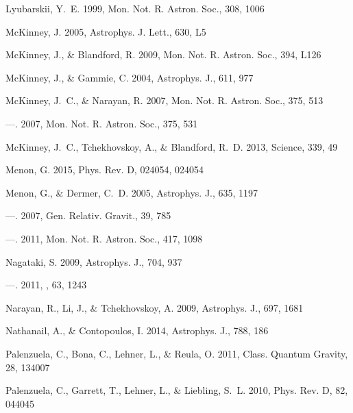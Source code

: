 \documentclass[iop,apj]{emulateapj}
\begin{document}
\begin{thebibliography}{}
Lyubarskii, Y.~E. 1999, Mon. Not. R. Astron. Soc., 308, 1006

McKinney, J. 2005, Astrophys. J. Lett., 630, L5

McKinney, J., \& Blandford, R. 2009, Mon. Not. R. Astron. Soc., 394, L126

McKinney, J., \& Gammie, C. 2004, Astrophys. J., 611, 977

McKinney, J.~C., \& Narayan, R. 2007{}, Mon. Not. R. Astron. Soc.,
  375, 513

---. 2007{}, Mon. Not. R. Astron. Soc., 375, 531

McKinney, J.~C., Tchekhovskoy, A., \& Blandford, R.~D. 2013, Science, 339, 49

Menon, G. 2015, Phys. Rev. D, 024054, 024054

Menon, G., \& Dermer, C.~D. 2005, Astrophys. J., 635, 1197

---. 2007, Gen. Relativ. Gravit., 39, 785

---. 2011, Mon. Not. R. Astron. Soc., 417, 1098

Nagataki, S. 2009, Astrophys. J., 704, 937

---. 2011, \pasj, 63, 1243

Narayan, R., Li, J., \& Tchekhovskoy, A. 2009, Astrophys. J., 697, 1681

Nathanail, A., \& Contopoulos, I. 2014, Astrophys. J., 788, 186

Palenzuela, C., Bona, C., Lehner, L., \& Reula, O. 2011, Class. Quantum
  Gravity, 28, 134007

Palenzuela, C., Garrett, T., Lehner, L., \& Liebling, S.~L. 2010, Phys. Rev. D,
  82, 044045


\end{thebibliography}
\end{document}
